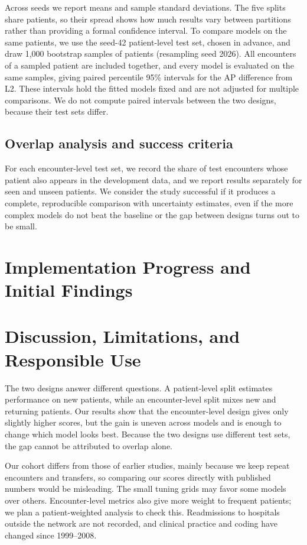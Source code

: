 \documentclass[conference]{IEEEtran}
\begin{document}
Across seeds we report means and sample standard deviations. The five splits share patients, so their spread shows how much results vary between partitions rather than providing a formal confidence interval. To compare models on the same patients, we use the seed-42 patient-level test set, chosen in advance, and draw 1,000 bootstrap samples of patients (resampling seed 2026). All encounters of a sampled patient are included together, and every model is evaluated on the same samples, giving paired percentile 95\% intervals for the AP difference from L2. These intervals hold the fitted models fixed and are not adjusted for multiple comparisons. We do not compute paired intervals between the two designs, because their test sets differ.

\subsection{Overlap analysis and success criteria}
For each encounter-level test set, we record the share of test encounters whose patient also appears in the development data, and we report results separately for seen and unseen patients. We consider the study successful if it produces a complete, reproducible comparison with uncertainty estimates, even if the more complex models do not beat the baseline or the gap between designs turns out to be small.

\section{Implementation Progress and Initial Findings}


\section{Discussion, Limitations, and Responsible Use}
The two designs answer different questions. A patient-level split estimates performance on new patients, while an encounter-level split mixes new and returning patients. Our results show that the encounter-level design gives only slightly higher scores, but the gain is uneven across models and is enough to change which model looks best. Because the two designs use different test sets, the gap cannot be attributed to overlap alone.

Our cohort differs from those of earlier studies, mainly because we keep repeat encounters and transfers, so comparing our scores directly with published numbers would be misleading. The small tuning grids may favor some models over others. Encounter-level metrics also give more weight to frequent patients; we plan a patient-weighted analysis to check this. Readmissions to hospitals outside the network are not recorded, and clinical practice and coding have changed since 1999--2008.
\end{document}
